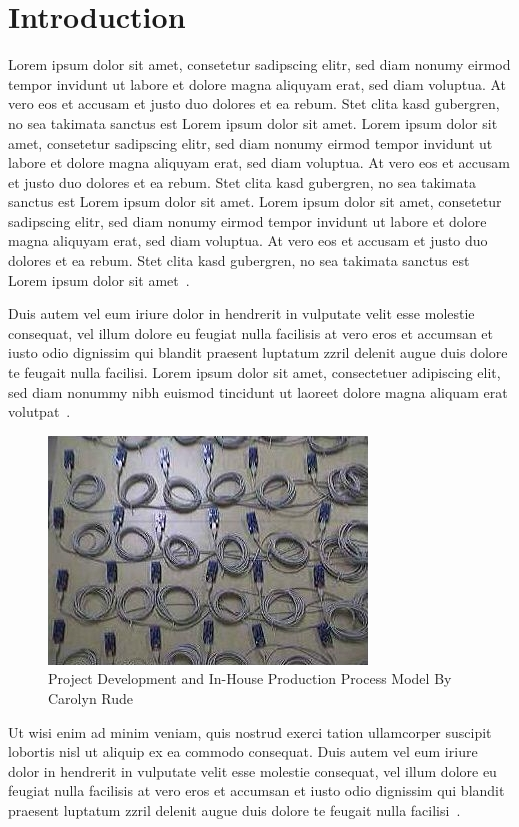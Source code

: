 \chapter{Introduction}
Lorem ipsum dolor sit amet, consetetur sadipscing elitr,  sed diam nonumy eirmod
tempor invidunt ut labore et dolore magna aliquyam erat, sed diam voluptua. At
vero eos et accusam et justo duo dolores et ea rebum. Stet clita kasd gubergren,
no sea takimata sanctus est Lorem ipsum dolor sit amet. Lorem ipsum dolor sit
amet, consetetur sadipscing elitr,  sed diam nonumy eirmod tempor invidunt ut
labore et dolore magna aliquyam erat, sed diam voluptua. At vero eos et accusam
et justo duo dolores et ea rebum. Stet clita kasd gubergren, no sea takimata
sanctus est Lorem ipsum dolor sit amet. Lorem ipsum dolor sit amet, consetetur
sadipscing elitr,  sed diam nonumy eirmod tempor invidunt ut labore et dolore
magna aliquyam erat, sed diam voluptua. At vero eos et accusam et justo duo
dolores et ea rebum. Stet clita kasd gubergren, no sea takimata sanctus est
Lorem ipsum dolor sit amet~\cite{aror:eseoa}.

Duis autem vel eum iriure dolor in hendrerit in vulputate velit esse molestie
consequat, vel illum dolore eu feugiat nulla facilisis at vero eros et accumsan
et iusto odio dignissim qui blandit praesent luptatum zzril delenit augue duis
dolore te feugait nulla facilisi. Lorem ipsum dolor sit amet, consectetuer
adipiscing elit, sed diam nonummy nibh euismod tincidunt ut laoreet dolore
magna aliquam erat volutpat~\cite{aror:alits}.

\begin{figure}
\begin{center}
\includegraphics{testbed}
\caption{Project Development and In-House Production Process Model By Carolyn Rude}
\end{center}
\end{figure}

Ut wisi enim ad minim veniam, quis nostrud exerci tation ullamcorper suscipit
lobortis nisl ut aliquip ex ea commodo consequat. Duis autem vel eum iriure
dolor in hendrerit in vulputate velit esse molestie consequat, vel illum dolore
eu feugiat nulla facilisis at vero eros et accumsan et iusto odio dignissim qui
blandit praesent luptatum zzril delenit augue duis dolore te feugait nulla
facilisi~\cite{barr:swahn}.

